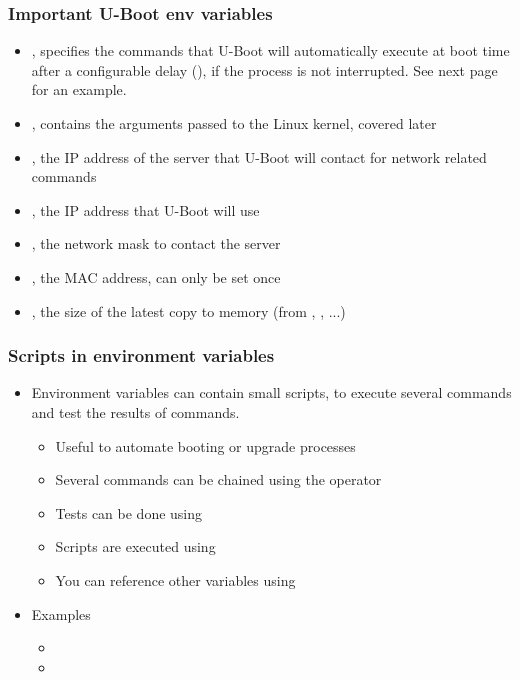 \begin{frame}
  \frametitle{Important U-Boot env variables}
  \begin{itemize}
  \item {}, specifies the commands that U-Boot will
    automatically execute at boot time after a configurable delay
    (), if the process is not interrupted. See next
    page for an example.
  \item {}, contains the arguments passed to the Linux
    kernel, covered later
  \item {}, the IP address of the server that U-Boot will
    contact for network related commands
  \item {}, the IP address that U-Boot will use
  \item {}, the network mask to contact the server
  \item {}, the MAC address, can only be set once
  \item {}, the size of the latest copy to memory
    (from , , ...)
  \end{itemize}
\end{frame}

\begin{frame}
  \frametitle{Scripts in environment variables}
  \begin{itemize}
  \item Environment variables can contain small scripts, to execute
    several commands and test the results of commands.
    \begin{itemize}
    \item Useful to automate booting or upgrade processes
    \item Several commands can be chained using the \code{;} operator
    \item Tests can be done using
    \item Scripts are executed using 
    \item You can reference other variables using
    \end{itemize}
  \item Examples
    \begin{itemize}
    \item {}
    \item {}
  \end{itemize}
\end{itemize}
\end{frame}

